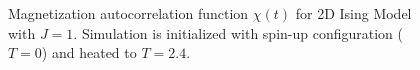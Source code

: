 \documentclass{article}
\begin{document}

\begin{figure}

\caption{Magnetization autocorrelation function $\chi(t)$ for 2D Ising Model with
$J=1$. Simulation is initialized with spin-up configuration
($T = 0$) and heated to $T=2.4$.}
\end{figure}
\end{document}
